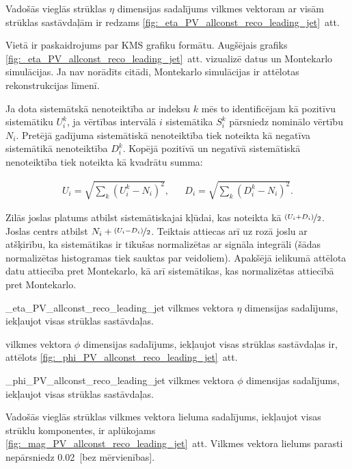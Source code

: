 Vadošās vieglās strūklas \leadingjet $\eta$ dimensijas sadalījums vilkmes vektoram ar visām strūklas sastāvdaļām ir redzams \ref{fig:_eta_PV_allconst_reco_leading_jet}~att.

Vietā ir paskaidrojums par KMS grafiku formātu. Augšējais grafiks \ref{fig:_eta_PV_allconst_reco_leading_jet}~att. vizualizē datus un Montekarlo simulācijas. Ja nav norādīts citādi, Montekarlo simulācijas ir attēlotas rekonstrukcijas līmenī.

Ja dota sistemātskā nenoteiktība ar indeksu $k$ mēs to identificējam kā pozitīvu sistemātiku $U^{k}_{i}$, ja vērtības intervālā $i$ sistemātika $S^{k}_i$ pārsniedz nominālo vērtību $N_{i}$. Pretējā gadījuma sistemātiskā nenoteiktība tiek noteikta kā negatīva sistemātikā nenoteiktība $D^{k}_{i}$. Kopējā pozitīvā un negatīvā sistemātiskā nenoteiktība tiek noteikta kā kvadrātu summa:

\begin{align}
U_{i}=\sqrt{\sum_{k}\left(U^{k}_{i}-N_{i}\right)^{2}}, && D_{i}=\sqrt{\sum_{k}\left(D^{k}_{i}-N_{i}\right)^{2}}.
\end{align}

Zilās joslas platums atbilst sistemātiskajai kļūdai, kas noteikta kā $\nicefrac{(U_{i}+D_{i})}{2}$. Joslas centrs atbilst $N_{i}+\nicefrac{(U_{i}-D_{i})}{2}$. Teiktais attiecas arī uz rozā joslu ar atšķirību, ka sistemātikas ir tikušas normalizētas ar signāla integrāli (šādas normalizētas histogramas tiek sauktas par \gls{veidoliem}). Apakšējā ielikumā attēlota datu attiecība pret Montekarlo, kā arī sistemātikas, kas normalizētas attiecībā pret Montekarlo.

          {_eta_PV_allconst_reco_leading_jet}
          {\leadingjet vilkmes vektora $\eta$ dimensijas sadalījums, iekļaujot visas strūklas sastāvdaļas.}

\leadingjet vilkmes vektora $\phi$ dimensijas sadalījums, iekļaujot visas strūklas sastāvdaļas ir, attēlots \ref{fig:_phi_PV_allconst_reco_leading_jet}~att. 

          {_phi_PV_allconst_reco_leading_jet}
          {\leadingjet vilkmes vektora $\phi$ dimensijas sadalījums, iekļaujot visas strūklas sastāvdaļas.}

Vadošās vieglās strūklas vilkmes vektora lieluma sadalījums, iekļaujot visas strūklu komponentes, ir aplūkojams \ref{fig:_mag_PV_allconst_reco_leading_jet}~att. Vilkmes vektora lielums parasti nepārsniedz \num{0.02}~[bez mērvienības].


